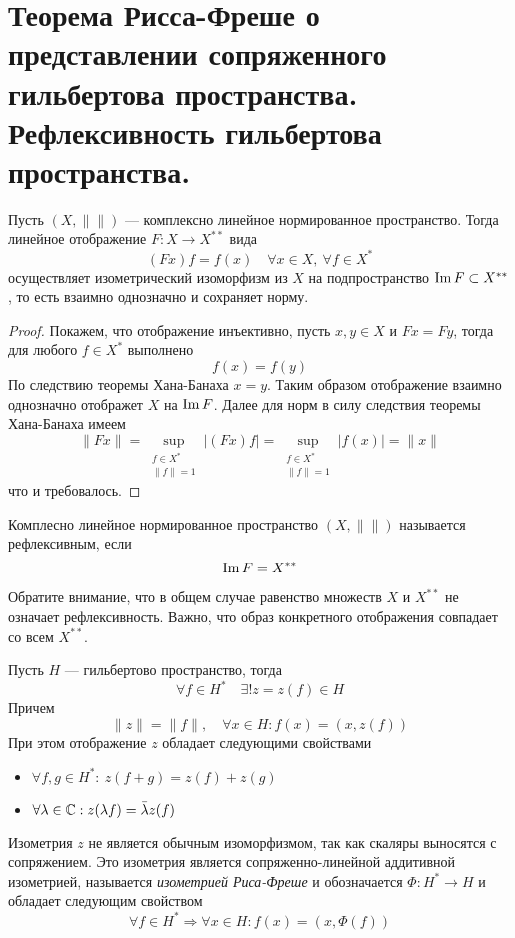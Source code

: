 \newpage
\section{Теорема Рисса-Фреше о представлении сопряженного гильбертова пространства. Рефлексивность гильбертова пространства.}
\begin{claim}
	Пусть $(X, \|\|)$ --- комплексно линейное нормированное пространство. Тогда линейное отображение $F \colon X \to X^{**}$ вида 
	$$
	(Fx)f = f(x) \quad \forall x \in X, \ \forall f \in X^*
	$$
	осуществляет изометрический изоморфизм из $X$ на подпространство $\operatorname{Im} F \subset X^{**}$, то есть взаимно однозначно и сохраняет норму. 
\end{claim}
\begin{proof}
	Покажем, что отображение инъективно, пусть $x,y \in X$ и $Fx = Fy$, тогда для любого $f \in X^*$ выполнено 
	$$
	f(x) = f(y)
	$$
	По следствию теоремы Хана-Банаха $x = y$. Таким образом отображение взаимно однозначно отображет $X$ на $\operatorname{Im} F$. Далее для норм в силу следствия теоремы Хана-Банаха имеем
	$$
	\|Fx\| = \sup\limits_{\substack{f \in X^* \\ \|f\| =1 }} |(Fx)f| = \sup\limits_{\substack{f \in X^* \\ \|f\| =1 }} |f(x)| = \|x\|
	$$
	что и требовалось.
\end{proof}
\begin{definition}
	Комплесно линейное нормированное пространство $(X, \|\|)$ называется рефлексивным, если
	$$
	\operatorname{Im} F = X^{**}
	$$
\end{definition}
\begin{remark}
	Обратите внимание, что в общем случае равенство множеств $X$ и $X^{**}$ не означает рефлексивность. Важно, что образ конкретного отображения совпадает со всем $X^{**}$.
\end{remark}
\begin{theorem}
	Пусть $H$ --- гильбертово пространство, тогда $$\forall f \in H^* \quad  \exists! z = z(f) \in H$$ Причем $$\|z\| = \|f\|, \quad \forall x \in H\colon f(x) = (x,z(f)) $$
	При этом отображение $z$ обладает следующими свойствами
	\begin{itemize}
		\item $\forall f,g \in H^*: \ z(f + g) = z(f) + z(g)$
		\item $\forall \lambda \in \mathbb{C}: z(\lambda f) = \bar{\lambda} z(f)$
	\end{itemize}
\end{theorem}
\begin{definition}
	Изометрия $z$ не является обычным изоморфизмом, так как скаляры выносятся с сопряжением. Это изометрия является сопряженно-линейной аддитивной изометрией, называется  \textit{изометрией Риса-Фреше} и обозначается $\Phi : H^* \to H$ и обладает следующим свойством 
	$$
	\forall f \in H^* \Rightarrow \forall x \in H \colon f(x) = (x, \Phi(f))
	$$
\end{definition}
